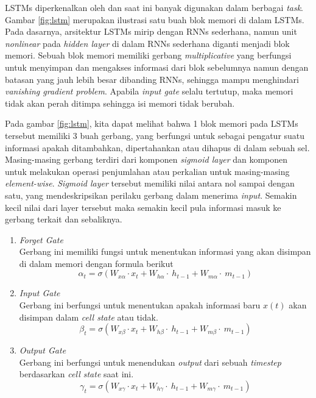 LSTMs diperkenalkan oleh \cite{hochreiter1997long} dan saat ini banyak digunakan dalam berbagai \textit{task}. Gambar \ref{fig:lstm} merupakan ilustrasi satu buah blok memori di dalam LSTMs. Pada dasarnya, arsitektur LSTMs mirip dengan RNNs sederhana, namun unit \textit{nonlinear} pada \textit{hidden layer} di dalam RNNs sederhana diganti menjadi blok memori. Sebuah blok memori memiliki gerbang \textit{multiplicative} yang berfungsi untuk menyimpan dan mengakses informasi dari blok sebelumnya namun dengan batasan yang jauh lebih besar dibanding RNNs, sehingga mampu menghindari \textit{vanishing gradient problem}. Apabila \textit{input gate} selalu tertutup, maka memori tidak akan perah ditimpa sehingga isi memori tidak berubah.

Pada gambar \ref{fig:lstm}, kita dapat melihat bahwa 1 blok memori pada LSTMs tersebut memiliki 3 buah gerbang, yang berfungsi untuk sebagai pengatur suatu informasi apakah ditambahkan, dipertahankan atau dihapus di dalam sebuah sel. Masing-masing gerbang terdiri dari komponen \textit{sigmoid layer} dan komponen untuk melakukan operasi penjumlahan atau perkalian untuk masing-masing \textit{element-wise}. \textit{Sigmoid layer} tersebut memiliki nilai antara nol sampai dengan satu, yang mendeskripsikan perilaku gerbang dalam menerima \textit{input}. Semakin kecil nilai dari layer tersebut maka semakin kecil pula informasi masuk ke gerbang terkait dan sebaliknya. 

\begin{enumerate}
	\item \textit{Forget Gate}\\
	Gerbang ini memiliki fungsi untuk menentukan informasi yang akan disimpan di dalam memori dengan formula berikut
	\begin{equation}\label{eq:forget_lstm}
	\alpha_{t}=\sigma(W_{x\alpha}\cdot x_{t}+W_{h\alpha}\cdot~h_{t-1}+W_{m\alpha}\cdot~m_{t-1})
	\end{equation}
	
	\item \textit{Input Gate}\\
	Gerbang ini berfungsi untuk menentukan apakah informasi baru $ x(t) $ akan disimpan dalam \textit{cell state} atau tidak. 
	\begin{equation}\label{eq:input_lstm}
	\beta_{t}=\sigma(W_{x\beta}\cdot x_{t}+W_{h\beta}\cdot~h_{t-1}+W_{m\beta}\cdot~m_{t-1})
	\end{equation}
	
	\item \textit{Output Gate}\\
	Gerbang ini berfungsi untuk menendukan \textit{output} dari sebuah \textit{timestep} berdasarkan \textit{cell state} saat ini.
	\begin{equation}\label{eq:output_lstm}
	\gamma_{t}=\sigma(W_{x\gamma}\cdot x_{t}+W_{h\gamma}\cdot~h_{t-1}+W_{m\gamma}\cdot~m_{t-1})
	\end{equation}
	
\end{enumerate}

